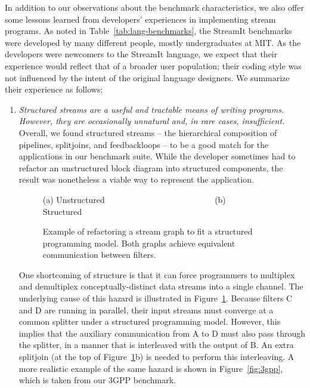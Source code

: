 In addition to our observations about the benchmark characteristics,
we also offer some lessons learned from developers' experiences in
implementing stream programs.  As noted in
Table~\ref{tab:lang-benchmarks}, the StreamIt benchmarks were
developed by many different people, mostly undergraduates at MIT.  As
the developers were newcomers to the StreamIt language, we expect that
their experience would reflect that of a broader user population;
their coding style was not influenced by the intent of the original
language designers.  We summarize their experience as follows:

\begin{enumerate}

\item {\it Structured streams are a useful and tractable means of
  writing programs.  However, they are occasionally unnatural and, in
  rare cases, insufficient.}  Overall, we found structured streams --
  the hierarchical composition of pipelines, splitjoins, and
  feedbackloops -- to be a good match for the applications in our
  benchmark suite.  While the developer sometimes had to refactor an
  unstructured block diagram into structured components, the result
  was nonetheless a viable way to represent the application.

\begin{figure}[t]
\centering
{}

(a) Unstructured ~~~~~~~~~~~~~~~~~~~~~~~~~ (b) Structured~~~~~~
\caption[Refactoring a stream graph to fit a structured programming
  model]{Example of refactoring a stream graph to fit a structured
  programming model.  Both graphs achieve equivalent communication
  between filters.
\protect\label{fig:interleaving}}
\end{figure}

  One shortcoming of structure is that it can force programmers to
  multiplex and demultiplex conceptually-distinct data streams into a
  single channel.  The underlying cause of this hazard is illustrated
  in Figure~\ref{fig:interleaving}.  Because filters C and D are
  running in parallel, their input streams must converge at a common
  splitter under a structured programming model.  However, this
  implies that the auxiliary communication from A to D must also pass
  through the splitter, in a manner that is interleaved with the
  output of B.  An extra splitjoin (at the top of
  Figure~\ref{fig:interleaving}b) is needed to perform this
  interleaving.  A more realistic example of the same hazard is shown
  in Figure~\ref{fig:3gpp}, which is taken from our 3GPP benchmark.


\end{enumerate}

